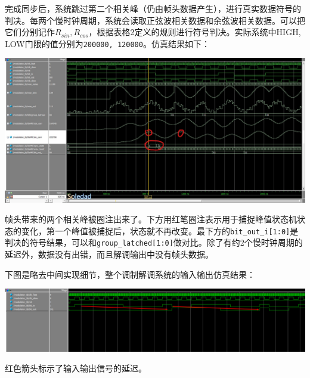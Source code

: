 完成同步后，系统跳过第二个相关峰（仍由帧头数据产生），进行真实数据符号的判决。每两个慢时钟周期，系统会读取正弦波相关数据和余弦波相关数据。可以把它们分别记作$R_{sin}, R_{cos}$，根据表格2定义的规则进行符号判决。实际系统中HIGH, LOW门限的值分别为\texttt{200000, 120000}。仿真结果如下：\par
\vspace{10pt}
\includegraphics[width = .9\textwidth]{images//demodulator.jpg}\vspace{10pt}\par
帧头带来的两个相关峰被圈注出来了。下方用红笔圈注表示用于捕捉峰值状态机状态的变化，第一个峰值被捕捉后，状态就不再改变。最下方的\texttt{bit\_out\_i[1:0]}是判决的符号结果，可以和\texttt{group\_latched[1:0]}做对比。除了有约2个慢时钟周期的延迟外，数据没有出错，而且解调输出中没有帧头数据。\par

下图是略去中间实现细节，整个调制解调系统的输入输出仿真结果：\par
\vspace{10pt}
\includegraphics[width = .9\textwidth]{images//mod_demod.png}\vspace{10pt}\par
红色箭头标示了输入输出信号的延迟。